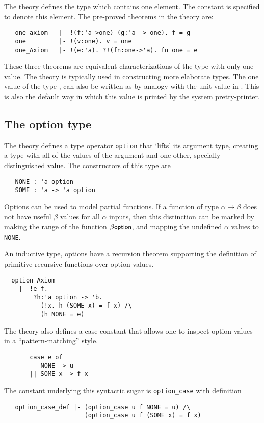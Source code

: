 The theory  defines  the type   which  contains one element.
The constant    is specified  to denote  this element.   The pre-proved
theorems in the theory  are:

\begin{hol}
\begin{verbatim}
   one_axiom   |- !(f:'a->one) (g:'a -> one). f = g
   one         |- !(v:one). v = one
   one_Axiom   |- !(e:'a). ?!(fn:one->'a). fn one = e
\end{verbatim}
\end{hol}

\noindent These three theorems are equivalent characterizations of the type
with only one value. The theory  is typically used in
constructing more elaborate types.  The one value of the type
, can also be written as \ml{()} by analogy with the unit
value in \ML.  This is also the default way in which this value is
printed by the system pretty-printer.

\subsection{The option type}

The theory  defines a type operator \verb+option+
that `lifts' its argument type, creating a type with all of the
values of the argument and one other, specially distinguished value.
The constructors of this type are
\begin{verbatim}
   NONE : 'a option
   SOME : 'a -> 'a option
\end{verbatim}
Options can be used to model partial functions.  If a function of type
$\alpha\rightarrow\beta$ does not have useful $\beta$ values for all
$\alpha$ inputs, then this distinction can be marked by making the
range of the function $\beta\mbox{\small{\textbf{\sf{option}}}}$, and mapping the
undefined $\alpha$ values to {\small\verb+NONE+}.

An inductive type, options have a recursion theorem supporting the
definition of primitive recursive functions over option values.
%
{\small
\begin{verbatim}
  option_Axiom
    |- !e f.
        ?h:'a option -> 'b.
          (!x. h (SOME x) = f x) /\
          (h NONE = e)
\end{verbatim}
}
The  theory also defines a case constant that allows
one to inspect option values in a ``pattern-matching'' style.
{\small
\begin{verbatim}
       case e of
          NONE -> u
       || SOME x -> f x
\end{verbatim}
}
The constant underlying this syntactic sugar is \verb+option_case+
with definition
{\small
\begin{verbatim}
   option_case_def |- (option_case u f NONE = u) /\
                      (option_case u f (SOME x) = f x)
\end{verbatim}}

